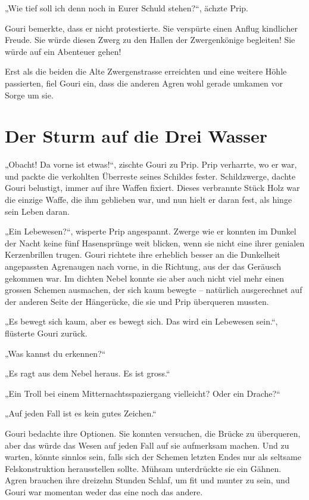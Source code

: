 \documentclass[10pt, a4paper, oneside]{book}
\begin{document}
„Wie tief soll ich denn noch in Eurer Schuld stehen?“, ächzte Prip.

Gouri bemerkte, dass er nicht protestierte. Sie verspürte einen Anflug kindlicher Freude. Sie würde diesen Zwerg zu den Hallen der Zwergenkönige begleiten! Sie würde auf ein Abenteuer gehen!

Erst als die beiden die Alte Zwergenstrasse erreichten und eine weitere Höhle passierten, fiel Gouri ein, dass die anderen Agren wohl gerade umkamen vor Sorge um sie.






\newpage
\section{Der Sturm auf die Drei Wasser}

„Obacht! Da vorne ist etwas!“, zischte Gouri zu Prip. Prip verharrte, wo er war, und packte die verkohlten Überreste seines Schildes fester. Schildzwerge, dachte Gouri belustigt, immer auf ihre Waffen fixiert. Dieses verbrannte Stück Holz war die einzige Waffe, die ihm geblieben war, und nun hielt er daran fest, als hinge sein Leben daran.

„Ein Lebewesen?“, wisperte Prip angespannt. Zwerge wie er konnten im Dunkel der Nacht keine fünf Hasensprünge weit blicken, wenn sie nicht eine ihrer genialen Kerzenbrillen trugen. Gouri richtete ihre erheblich besser an die Dunkelheit angepassten Agrenaugen nach vorne, in die Richtung, aus der das Geräusch gekommen war. Im dichten Nebel konnte sie aber auch nicht viel mehr einen grossen Schemen ausmachen, der sich kaum bewegte – natürlich ausgerechnet auf der anderen Seite der Hängerücke, die sie und Prip überqueren mussten.

„Es bewegt sich kaum, aber es bewegt sich. Das wird ein Lebewesen sein.“, flüsterte Gouri zurück.

„Was kannst du erkennen?“

„Es ragt aus dem Nebel heraus. Es ist gross.“

„Ein Troll bei einem Mitternachtsspaziergang vielleicht? Oder ein Drache?“

„Auf jeden Fall ist es kein gutes Zeichen.“

Gouri bedachte ihre Optionen. Sie konnten versuchen, die Brücke zu überqueren, aber das würde das Wesen auf jeden Fall auf sie aufmerksam machen. Und zu warten, könnte sinnlos sein, falls sich der Schemen letzten Endes nur als seltsame Felskonstruktion herausstellen sollte. Mühsam unterdrückte sie ein Gähnen. Agren brauchen ihre dreizehn Stunden Schlaf, um fit und munter zu sein, und Gouri war momentan weder das eine noch das andere.
\end{document}
